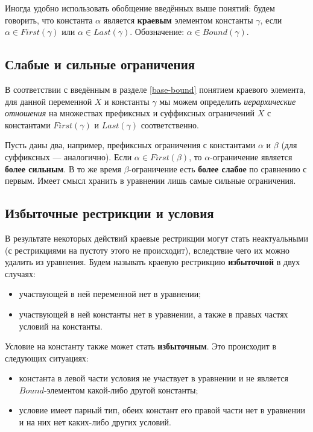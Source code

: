 \documentclass[12pt]{article}
\begin{document}
Иногда удобно использовать обобщение введённых выше понятий: будем
говорить, что константа $\alpha$ является \textbf{краевым} элементом константы
$\gamma$, если $\alpha \in First(\gamma)$ или $\alpha \in Last(\gamma)$.
Обозначение: $\alpha \in Bound(\gamma)$.


\subsection{Слабые и сильные ограничения}

В соответствии с введённым в разделе \ref{base-bound} понятием краевого
элемента, для данной переменной $X$ и константы $\gamma$ мы можем определить
\textit{иерархические отношения} на множествах префиксных и суффиксных
ограничений $X$ с константами $First(\gamma)$ и $Last(\gamma)$ соответственно.

Пусть даны два, например, префиксных ограничения с константами $\alpha$ и
$\beta$ (для суффиксных --- аналогично). Если $\alpha \in First(\beta)$, то
$\alpha$-ограничение является \textbf{более сильным}. В то же время
$\beta$-ограничение есть \textbf{более слабое} по сравнению с первым. Имеет
смысл хранить в уравнении лишь самые сильные ограничения.


\subsection{Избыточные рестрикции и условия}

В результате некоторых действий краевые рестрикции могут стать неактуальными
(с рестрикциями на пустоту этого не происходит), вследствие чего их можно
удалить из уравнения. Будем называть краевую рестрикцию \textbf{избыточной} в
двух случаях:
\begin{itemize}
  \item участвующей в ней переменной нет в уравнении;
  \item участвующей в ней константы нет в уравнении, а также в правых частях
  условий на константы.
\end{itemize}

Условие на константу также может стать \textbf{избыточным}. Это происходит в
следующих ситуациях:
\begin{itemize}
  \item константа в левой части условия не участвует в уравнении и не является
  $Bound$-элементом какой-либо другой константы;
  \item условие имеет парный тип, обеих констант его правой части нет в
  уравнении и на них нет каких-либо других условий.
\end{itemize}
\end{document}
